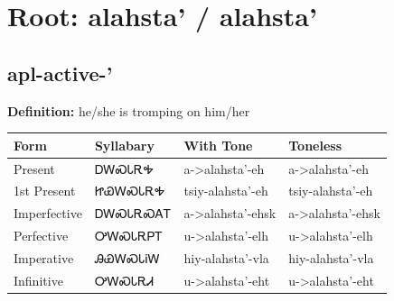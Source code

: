 \documentclass{article}%
\begin{document}
%
\normalsize%
\section*{Root: alahsta' / alahsta'}%
\subsection*{apl-active-'}%
\textbf{Definition: }%
he/she is tromping on him/her%
\\[0.5em]%
\begin{tabular}{|l|l|l|l|}%
\hline%
\textbf{Form}&\textbf{Syllabary}&\textbf{With Tone}&\textbf{Toneless}\\%
\hline%
Present&ᎠᎳᏍᏓᎡᎭ&a{-}>alahsta'{-}eh&a{-}>alahsta'{-}eh\\%
1st Present&ᏥᏯᎳᏍᏓᎡᎭ&tsiy{-}alahsta'{-}eh&tsiy{-}alahsta'{-}eh\\%
Imperfective&ᎠᎳᏍᏓᎡᏍᎪᎢ&a{-}>alahsta'{-}ehsk&a{-}>alahsta'{-}ehsk\\%
Perfective&ᎤᎳᏍᏓᎡᏢᎢ&u{-}>alahsta'{-}elh&u{-}>alahsta'{-}elh\\%
Imperative&ᎯᏯᎳᏍᏓᎥᎳ&hiy{-}alahsta'{-}vla&hiy{-}alahsta'{-}vla\\%
Infinitive&ᎤᎳᏍᏓᎡᏗ&u{-}>alahsta'{-}eht&u{-}>alahsta'{-}eht\\%
\hline%
\end{tabular}%
\\[1em]%
\end{document}
